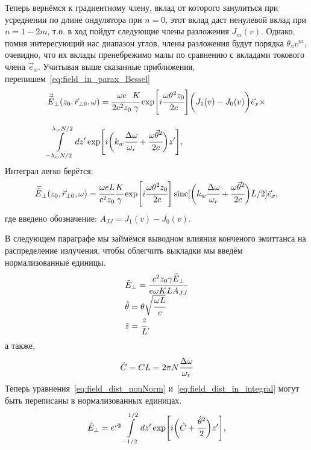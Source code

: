 \documentclass[14pt,a4paper]{extarticle}
\numberwithin{equation}{section}
\DeclareMathOperator{\sinc}{sinc}
\begin{document}
Теперь вернёмся к градиентному члену, вклад от которого занулиться при усреднении по длине ондулятора при $n = 0$, этот вклад даст ненулевой вклад при $n = 1 - 2m$, т.о. в ход пойдут следующие члены разложения $J_m(v)$. Однако, помня интересующий нас диапазон углов, члены разложения будут порядка $\theta_x v^m$, очевидно, что их вклады пренебрежимо малы по сравнению с вкладами токового члена $\vec{e}_x$. Учитывая выше сказанные приближения, перепишем~\ref{eq:field_in_parax_Bessel}
\begin{equation}
	\label{eq:field_dist_in_integral}
	\begin{array}{lcl}
		\vec{\widetilde{E}}_{\bot}(z_0,  \vec{r}_{\bot 0}, \omega) =
		\cfrac{\omega e}{2c^2z_0}\cfrac{K}{\gamma}\exp[i\cfrac{\omega \theta^2 z_0}{2c}]
		\bigg(J_1(v) - J_0(v)\bigg)\vec{e}_x\times\\
		\\
		\displaystyle\int\limits_{-\lambda_w N/2}^{\lambda_w N/2} dz'
		\exp[i\bigg(k_w \cfrac{\Delta\omega}{\omega_r} + 
		\cfrac{\omega\vec{\theta}^2}{2c}\bigg)z'],
	\end{array}	
\end{equation}
Интеграл легко берётся:
\begin{equation}
	\label{eq:field_dist_nonNorm}
	\begin{array}{lcl}
		\vec{\widetilde{E}}_{\bot}(z_0,  \vec{r}_{\bot 0}, \omega) =
		\cfrac{\omega eL}{c^2z_0}\cfrac{K}{\gamma}\exp[i\cfrac{\omega \theta^2 z_0}{2c}]
		\sinc[\bigg(k_w \cfrac{\Delta\omega}{\omega_r} + 
		\cfrac{\omega\vec{\theta}^2}{2c}\bigg)L/2]\vec{e}_x ,
	\end{array}	
\end{equation}
где введено обозначение: $A_{JJ} = J_1(v) - J_0(v)$. 

В следующем параграфе мы займёмся выводном влияния конченого эмиттанса на распределение излучения, чтобы облегчить выкладки мы введём нормализованные единицы.
\begin{equation}
	\label{eq:norm_units}
	\begin{array}{lcl}
		\hat{E}_{\bot} = \cfrac{c^2z_0\gamma \widetilde{E}_{\bot}}{e\omega KLA_{JJ}}\\
		\hat{\theta} = \theta\sqrt{\cfrac{\omega L}{c}}\\
		\hat{z} = \cfrac{z}{L} ,
	\end{array}	
\end{equation}
а также, 
\begin{equation}
	\hat{C} = CL = 2\pi N\cfrac{\Delta\omega}{\omega_r}
\end{equation}
Теперь уравнения~\ref{eq:field_dist_nonNorm} и~\ref{eq:field_dist_in_integral} могут быть переписаны в нормализованных единицах.
\begin{equation}
	\label{eq:field_dist_in_integral}
	\begin{array}{lcl}
		\hat{E}_{\bot} = e^{i\Phi}
		\displaystyle\int\limits_{-1/2}^{1/2} dz'
		\exp[i\bigg(\hat{C} + 
		\cfrac{\hat{\theta}^2}{2}\bigg)z'],
	\end{array}	
\end{equation}
\end{document}
